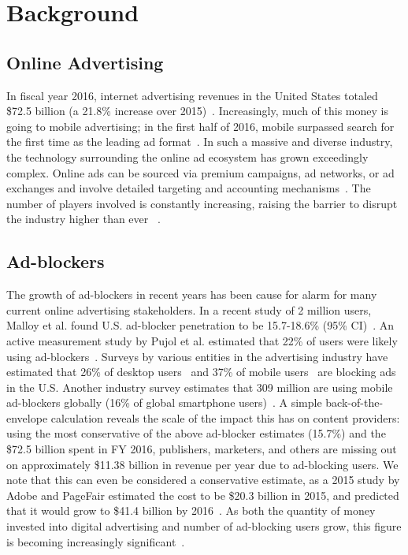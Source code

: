 \section{Background}
\subsection{Online Advertising}
In fiscal year 2016, internet advertising revenues in the United States totaled \$72.5 billion (a 21.8\% increase over 2015)~\cite{iabfy2016}.
Increasingly, much of this money is going to mobile advertising; in the first half of 2016, mobile surpassed search for the first time as the leading ad
format~\cite{iab2016}.
In such a massive and diverse industry, the technology surrounding the online ad ecosystem has grown exceedingly complex.
Online ads can be sourced via premium campaigns, ad networks, or ad exchanges and involve detailed targeting and accounting mechanisms~\cite{adscape}.
The number of players involved is constantly increasing, raising the barrier to disrupt the industry higher than ever ~\cite{lumascape}.

\subsection{Ad-blockers}
The growth of ad-blockers in recent years has been cause for alarm for many current online advertising stakeholders.
In a recent study of 2 million users, Malloy et al. found U.S. ad-blocker penetration to be 15.7-18.6\% (95\% CI)~\cite{malloy}.
An active measurement study by Pujol et al. estimated that 22\% of users were likely using ad-blockers~\cite{pujol}.
Surveys by various entities in the advertising industry have estimated that 26\% of desktop users~\cite{iab-blockers} and 37\% of mobile users~\cite{gwi} are blocking ads in the U.S.
Another industry survey estimates that 309 million are using mobile ad-blockers globally (16\% of global smartphone users)~\cite{pagefair}.
A simple back-of-the-envelope calculation reveals the scale of the impact this has on content providers: using the most conservative of the above ad-blocker estimates (15.7\%) and the \$72.5 billion spent in FY 2016, publishers, marketers, and others are missing out on approximately \$11.38 billion in revenue per year due to ad-blocking users.
We note that this can even be considered a conservative estimate, as a 2015 study by Adobe and PageFair estimated the cost to be \$20.3 billion in 2015, and predicted that it would grow to \$41.4 billion by 2016~\cite{pagefair2015cost}.
As both the quantity of money invested into digital advertising and number of ad-blocking users grow, this figure is becoming increasingly significant~\cite{iab2016}.

